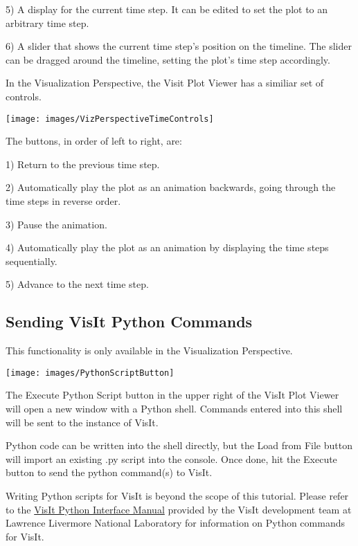 5) A display for the current time step. It can be edited to set the plot to an
arbitrary time step. 

6) A slider that shows the current time step's position on the timeline. The
slider can be dragged around the timeline, setting the plot's time step
accordingly.

In the Visualization Perspective, the Visit Plot Viewer has a similiar set of
controls.

\begin{center}
\texttt{[image: images/VizPerspectiveTimeControls]}
\end{center}

The buttons, in order of left to right, are:

1) Return to the previous time step.

2) Automatically play the plot as an animation backwards, going through the time
steps in reverse order.

3) Pause the animation.

4) Automatically play the plot as an animation by displaying the time steps
sequentially.

5) Advance to the next time step. 

\subsection{Sending VisIt Python Commands}

This functionality is only available in the Visualization Perspective.

\begin{center}
\texttt{[image: images/PythonScriptButton]}
\end{center}

The Execute Python Script button in the upper right of the VisIt Plot Viewer
will open a new window with a Python shell. Commands entered into this shell
will be sent to the instance of VisIt. 

Python code can be written into the shell directly, but the Load from File
button will import an existing .py script into the console. Once done, hit the
Execute button to send the python command(s) to VisIt.

Writing Python scripts for VisIt is beyond the scope of this tutorial. Please
refer to the
\href{https://wci.llnl.gov/simulation/computer-codes/visit/manuals}{VisIt Python
Interface Manual} provided by the VisIt development team at Lawrence Livermore
National Laboratory for information on Python commands for VisIt.

